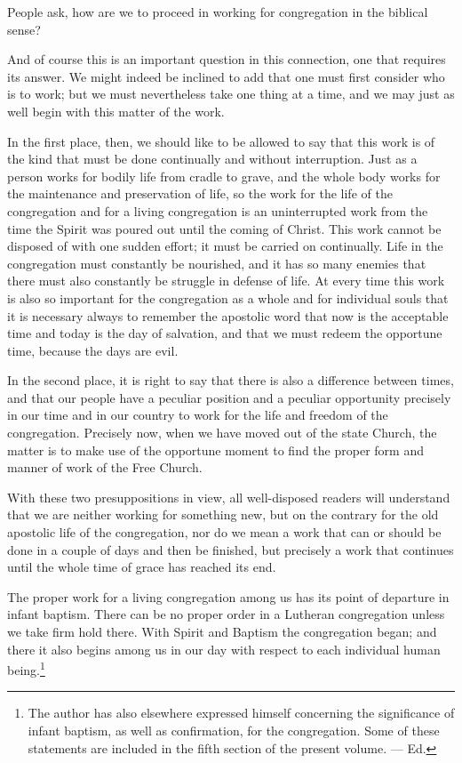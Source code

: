 People ask, how are we to proceed in working for congregation in the biblical sense?

And of course this is an important question in this connection, one that requires its answer. We might indeed be inclined to add that one must first consider who is to work; but we must nevertheless take one thing at a time, and we may just as well begin with this matter of the work.

In the first place, then, we should like to be allowed to say that this work is of the kind that must be done continually and without interruption. Just as a person works for bodily life from cradle to grave, and the whole body works for the maintenance and preservation of life, so the work for the life of the congregation and for a living congregation is an uninterrupted work from the time the Spirit was poured out until the coming of Christ. This work cannot be disposed of with one sudden effort; it must be carried on continually. Life in the congregation must constantly be nourished, and it has so many enemies that there must also constantly be struggle in defense of life. At every time this work is also so important for the congregation as a whole and for individual souls that it is necessary always to remember the apostolic word that now is the acceptable time and today is the day of salvation, and that we must redeem the opportune time, because the days are evil.

In the second place, it is right to say that there is also a difference between times, and that our people have a peculiar position and a peculiar opportunity precisely in our time and in our country to work for the life and freedom of the congregation. Precisely now, when we have moved out of the state Church, the matter is to make use of the opportune moment to find the proper form and manner of work of the Free Church.

With these two presuppositions in view, all well-disposed readers will understand that we are neither working for something new, but on the contrary for the old apostolic life of the congregation, nor do we mean a work that can or should be done in a couple of days and then be finished, but precisely a work that continues until the whole time of grace has reached its end.

The proper work for a living congregation among us has its point of departure in infant baptism. There can be no proper order in a Lutheran congregation unless we take firm hold there. With Spirit and Baptism the congregation began; and there it also begins among us in our day with respect to each individual human being.\footnote{The author has also elsewhere expressed himself concerning the significance of infant baptism, as well as confirmation, for the congregation. Some of these statements are included in the fifth section of the present volume. — Ed.} 

